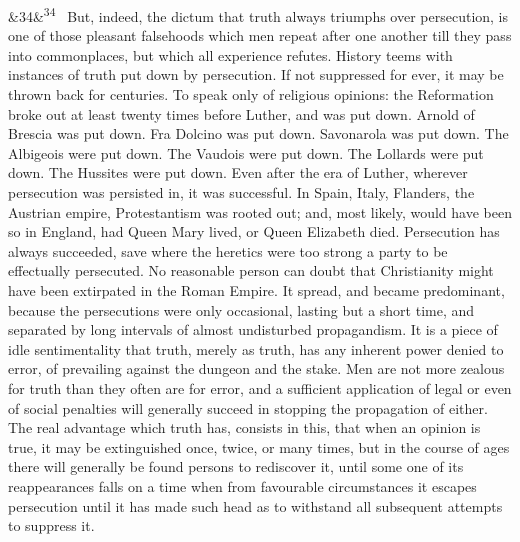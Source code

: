 \documentclass[12pt]{article}
\newcommand{\para}[1][]{\par\noindent\ifx&#1&\else\textsuperscript{\footnotesize #1}~\fi}
\begin{document}
\para[34] But, indeed, the dictum that truth always triumphs over persecution, is one of those pleasant falsehoods which men repeat after one another till they pass into commonplaces, but which all experience refutes. History teems with instances of truth put down by persecution. If not suppressed for ever, it may be thrown back for centuries. To speak only of religious opinions: the Reformation broke out at least twenty times before Luther, and was put down. Arnold of Brescia was put down. Fra Dolcino was put down. Savonarola was put down. The Albigeois were put down. The Vaudois were put down. The Lollards were put down. The Hussites were put down. Even after the era of Luther, wherever persecution was persisted in, it was successful. In Spain, Italy, Flanders, the Austrian empire, Protestantism was rooted out; and, most likely, would have been so in England, had Queen Mary lived, or Queen Elizabeth died. Persecution has always succeeded, save where the heretics were too strong a party to be effectually persecuted. No reasonable person can doubt that Christianity might have been extirpated in the Roman Empire. It spread, and became predominant, because the persecutions were only occasional, lasting but a short time, and separated by long intervals of almost undisturbed propagandism. It is a piece of idle sentimentality that truth, merely as truth, has any inherent power denied to error, of prevailing against the dungeon and the stake. Men are not more zealous for truth than they often are for error, and a sufficient application of legal or even of social penalties will generally succeed in stopping the propagation of either. The real advantage which truth has, consists in this, that when an opinion is true, it may be extinguished once, twice, or many times, but in the course of ages there will generally be found persons to rediscover it, until some one of its reappearances falls on a time when from favourable circumstances it escapes persecution until it has made such head as to withstand all subsequent attempts to suppress it.
\end{document}
